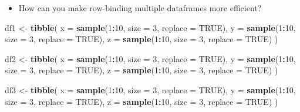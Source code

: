 \documentclass[
]{book}
\newenvironment{Shaded}{\begin{snugshade}}{\end{snugshade}}
\newcommand{\AttributeTok}[1]{\textcolor[rgb]{0.13,0.29,0.53}{#1}}
\newcommand{\ConstantTok}[1]{\textcolor[rgb]{0.56,0.35,0.01}{#1}}
\newcommand{\DecValTok}[1]{\textcolor[rgb]{0.00,0.00,0.81}{#1}}
\newcommand{\FunctionTok}[1]{\textcolor[rgb]{0.13,0.29,0.53}{\textbf{#1}}}
\newcommand{\NormalTok}[1]{#1}
\newcommand{\OtherTok}[1]{\textcolor[rgb]{0.56,0.35,0.01}{#1}}
\newcommand{\SpecialCharTok}[1]{\textcolor[rgb]{0.81,0.36,0.00}{\textbf{#1}}}
\providecommand{\tightlist}{%
  \setlength{\itemsep}{0pt}\setlength{\parskip}{0pt}}
\begin{document}
\begin{itemize}
\tightlist
\item
  How can you make row-binding multiple dataframes more efficient?
\end{itemize}

\begin{Shaded}
\begin{Highlighting}[]
\NormalTok{df1 }\OtherTok{\textless{}{-}} \FunctionTok{tibble}\NormalTok{(}
  \AttributeTok{x =} \FunctionTok{sample}\NormalTok{(}\DecValTok{1}\SpecialCharTok{:}\DecValTok{10}\NormalTok{, }\AttributeTok{size =} \DecValTok{3}\NormalTok{, }\AttributeTok{replace =} \ConstantTok{TRUE}\NormalTok{),}
  \AttributeTok{y =} \FunctionTok{sample}\NormalTok{(}\DecValTok{1}\SpecialCharTok{:}\DecValTok{10}\NormalTok{, }\AttributeTok{size =} \DecValTok{3}\NormalTok{, }\AttributeTok{replace =} \ConstantTok{TRUE}\NormalTok{),}
  \AttributeTok{z =} \FunctionTok{sample}\NormalTok{(}\DecValTok{1}\SpecialCharTok{:}\DecValTok{10}\NormalTok{, }\AttributeTok{size =} \DecValTok{3}\NormalTok{, }\AttributeTok{replace =} \ConstantTok{TRUE}\NormalTok{)}
\NormalTok{)}

\NormalTok{df2 }\OtherTok{\textless{}{-}} \FunctionTok{tibble}\NormalTok{(}
  \AttributeTok{x =} \FunctionTok{sample}\NormalTok{(}\DecValTok{1}\SpecialCharTok{:}\DecValTok{10}\NormalTok{, }\AttributeTok{size =} \DecValTok{3}\NormalTok{, }\AttributeTok{replace =} \ConstantTok{TRUE}\NormalTok{),}
  \AttributeTok{y =} \FunctionTok{sample}\NormalTok{(}\DecValTok{1}\SpecialCharTok{:}\DecValTok{10}\NormalTok{, }\AttributeTok{size =} \DecValTok{3}\NormalTok{, }\AttributeTok{replace =} \ConstantTok{TRUE}\NormalTok{),}
  \AttributeTok{z =} \FunctionTok{sample}\NormalTok{(}\DecValTok{1}\SpecialCharTok{:}\DecValTok{10}\NormalTok{, }\AttributeTok{size =} \DecValTok{3}\NormalTok{, }\AttributeTok{replace =} \ConstantTok{TRUE}\NormalTok{)}
\NormalTok{)}

\NormalTok{df3 }\OtherTok{\textless{}{-}} \FunctionTok{tibble}\NormalTok{(}
  \AttributeTok{x =} \FunctionTok{sample}\NormalTok{(}\DecValTok{1}\SpecialCharTok{:}\DecValTok{10}\NormalTok{, }\AttributeTok{size =} \DecValTok{3}\NormalTok{, }\AttributeTok{replace =} \ConstantTok{TRUE}\NormalTok{),}
  \AttributeTok{y =} \FunctionTok{sample}\NormalTok{(}\DecValTok{1}\SpecialCharTok{:}\DecValTok{10}\NormalTok{, }\AttributeTok{size =} \DecValTok{3}\NormalTok{, }\AttributeTok{replace =} \ConstantTok{TRUE}\NormalTok{),}
  \AttributeTok{z =} \FunctionTok{sample}\NormalTok{(}\DecValTok{1}\SpecialCharTok{:}\DecValTok{10}\NormalTok{, }\AttributeTok{size =} \DecValTok{3}\NormalTok{, }\AttributeTok{replace =} \ConstantTok{TRUE}\NormalTok{)}
\NormalTok{)}
\end{Highlighting}
\end{Shaded}
\end{document}
